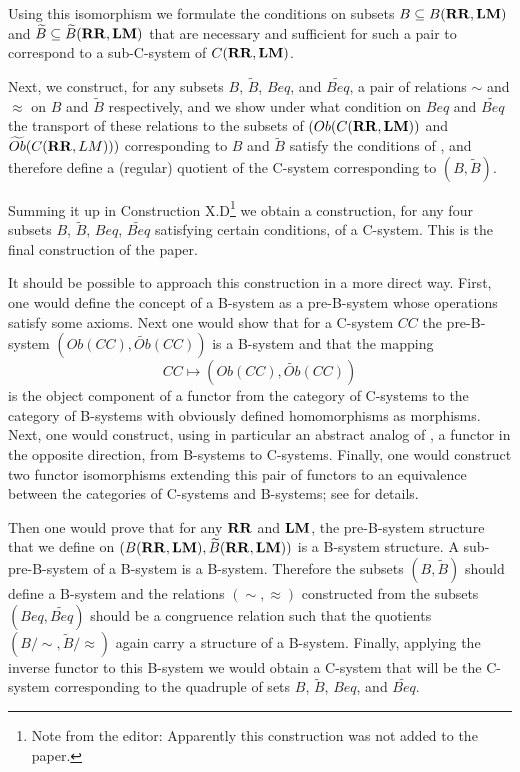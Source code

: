 \documentclass[onecolumn,12pt]{amsart}
\numberwithin{proposition}{subsection}
\newcommand{\wt}{\widetilde}
\newcommand{\RR}{{\bf RR}}
\newcommand{\LM}{{\bf LM}}
\newcommand{\editorfootnote}[1]{\footnote{Note from the editor: #1}}
\begin{document}
Using this isomorphism we formulate the conditions on subsets $B\subseteq B(\RR,\LM)$
and $\wt{B}\subseteq \wt{B}(\RR,\LM)$ that are necessary and sufficient
for such a pair to correspond to a sub-C-system of $C(\RR,\LM)$.

Next, we construct, for any subsets $B$, $\wt{B}$, $Beq$, and $\wt{Beq}$, a pair
of relations $\sim$ and $\approx$ on $B$ and $\wt{B}$ respectively, and we show
under what condition on $Beq$ and $\wt{Beq}$ the transport of these relations to
the subsets of $(Ob(C(\RR,\LM))$ and $\wt{Ob}(C(\RR,LM)))$ corresponding to $B$ and
$\wt{B}$ satisfy the conditions of \cite[Prop. 5.4]{Csubsystems}, and therefore
define a (regular) quotient of the C-system corresponding to $(B,\wt{B})$.

Summing it up in Construction X.D\editorfootnote{Apparently this construction was not added to the paper.} we obtain a construction, for any four
subsets $B$, $\wt{B}$, $Beq$, $\wt{Beq}$ satisfying certain conditions, of a
C-system. This is the final construction of the paper.

It should be possible to approach this construction in a more direct
way. First, one would define the concept of a B-system as a pre-B-system whose
operations satisfy some axioms. Next one would show that for a C-system $CC$
the pre-B-system $(Ob(CC),\wt{Ob}(CC))$ is a B-system and that the mapping
%
$$CC\mapsto (Ob(CC),\wt{Ob}(CC))$$
%
is the object component of a functor from the category of C-systems to the
category of B-systems with obviously defined homomorphisms as morphisms. Next,
one would construct, using in particular an abstract analog of
\cite[Def. 2.11]{Hofmann}, a functor in the opposite direction, from B-systems
to C-systems. Finally, one would construct two functor isomorphisms extending
this pair of functors to an equivalence between the categories of C-systems and
B-systems; see \cite{ahrens-latest} for details.

Then one would prove that for any $\RR$ and $\LM$, the pre-B-system structure that
we define on $(B(\RR,\LM),\wt{B}(\RR,\LM))$ is a B-system structure. A
sub-pre-B-system of a B-system is a B-system. Therefore the subsets
$(B,\wt{B})$ should define a B-system and the relations $(\sim,\approx)$
constructed from the subsets $(Beq,\wt{Beq})$ should be a congruence relation
such that the quotients $(B/{\sim},\wt{B}/\approx)$ again carry a structure of a
B-system. Finally, applying the inverse functor to this B-system we would
obtain a C-system that will be the C-system corresponding to the quadruple of
sets $B$, $\wt{B}$, $Beq$, and $\wt{Beq}$.
\end{document}
